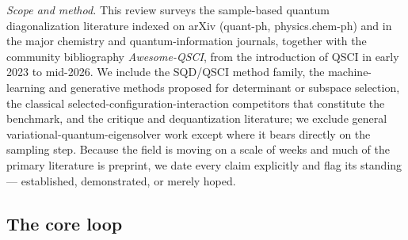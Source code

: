 \documentclass[11pt]{article}
\begin{document}
\emph{Scope and method.} This review surveys the sample-based quantum diagonalization literature indexed on arXiv (quant-ph, physics.chem-ph) and in the major chemistry and quantum-information journals, together with the community bibliography \emph{Awesome-QSCI}, from the introduction of QSCI in early 2023 to mid-2026. We include the SQD/QSCI method family, the machine-learning and generative methods proposed for determinant or subspace selection, the classical selected-configuration-interaction competitors that constitute the benchmark, and the critique and dequantization literature; we exclude general variational-quantum-eigensolver work except where it bears directly on the sampling step. Because the field is moving on a scale of weeks and much of the primary literature is preprint, we date every claim explicitly and flag its standing --- established, demonstrated, or merely hoped.


\subsection{The core loop}\label{sec:2-1}
\end{document}
